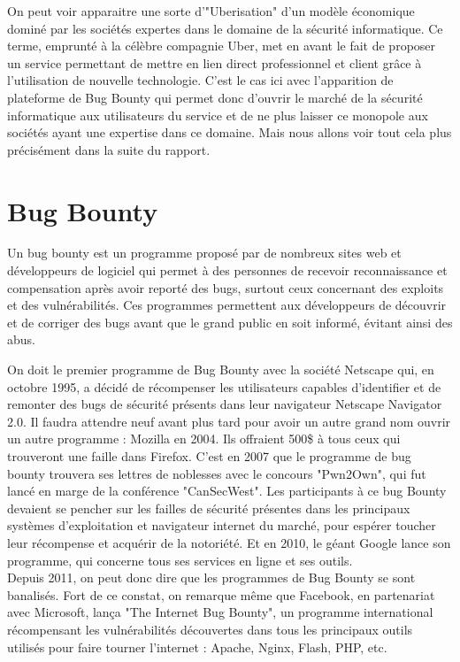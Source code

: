 \documentclass[a4paper]{memoir}
\begin{document}
On peut voir apparaitre une sorte d'"Uberisation" d'un modèle économique dominé par les sociétés expertes dans le domaine de la sécurité informatique. Ce terme, emprunté à la célèbre compagnie Uber, met en avant le fait de proposer un service permettant de mettre en lien direct professionnel et client grâce à l'utilisation de nouvelle technologie. C'est le cas ici avec l'apparition de plateforme de Bug Bounty qui permet donc d'ouvrir le marché de la sécurité informatique aux utilisateurs du service et de ne plus laisser ce monopole aux sociétés ayant une expertise dans ce domaine.
Mais nous allons voir tout cela plus précisément dans la suite du rapport.

\chapter{Bug Bounty}

Un bug bounty est un programme proposé par de nombreux sites web et développeurs de logiciel qui permet à des personnes de recevoir reconnaissance et compensation après avoir reporté des bugs, surtout ceux concernant des exploits et des vulnérabilités. Ces programmes permettent aux développeurs de découvrir et de corriger des bugs avant que le grand public en soit informé, évitant ainsi des abus. 

On doit le premier programme de Bug Bounty avec la société Netscape qui, en octobre 1995, a décidé de récompenser les utilisateurs capables d'identifier et de remonter des bugs de sécurité présents dans leur navigateur Netscape Navigator 2.0. Il faudra attendre neuf avant plus tard pour avoir un autre grand nom ouvrir un autre programme : Mozilla en 2004. Ils offraient 500\$ à tous ceux qui trouveront une faille dans Firefox.
C'est en 2007 que le programme de bug bounty trouvera ses lettres de noblesses avec le concours "Pwn2Own", qui fut lancé en marge de la conférence "CanSecWest". Les participants à ce bug Bounty devaient se pencher sur les failles de sécurité présentes dans les principaux systèmes d'exploitation et navigateur internet du marché, pour espérer toucher leur récompense et acquérir de la notoriété.
Et en 2010, le géant Google lance son programme, qui concerne tous ses services en ligne et ses outils. \\

Depuis 2011, on peut donc dire que les programmes de Bug Bounty se sont banalisés. Fort de ce constat, on remarque même que Facebook, en partenariat avec Microsoft, lança "The Internet Bug Bounty", un programme international récompensant les vulnérabilités découvertes dans tous les principaux outils utilisés pour faire tourner l'internet : Apache, Nginx, Flash, PHP, etc.\\
\end{document}
